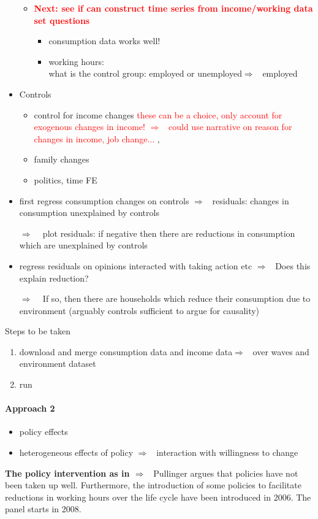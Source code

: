 \documentclass[12pt]{article}
\newcommand{\ar}{$\Rightarrow$ \ }
\newcommand{\tr}[1]{\textcolor{red}{#1}}
\begin{document}
\begin{itemize}
\begin{itemize}
\item\tr{\textbf{ Next: see if can construct time series from income/working data set questions}}
\begin{itemize}
\item consumption data works well! 
\item working hours: \\ what is the control group: employed or unemployed\ar employed
\end{itemize}
	\end{itemize}
\item Controls
\begin{itemize}
\item control for income changes \tr{these can be a choice, only account for exogenous changes in income! \ar could use narrative on reason for changes in income, job change... }, 
\item family changes
\item  politics, time FE
\end{itemize}	

\item first regress consumption changes on controls \ar residuals: changes in consumption unexplained by controls
\item[\ar] plot residuals: if negative then there are reductions in consumption which are unexplained by controls
\item regress residuals on opinions interacted with taking action etc \ar Does this explain reduction?
\item[\ar] If so, then there are households which reduce their consumption due to environment (arguably controls sufficient to argue for causality)
\end{itemize}

Steps to be taken
\begin{enumerate}
\item download and merge consumption data and income data\ar over waves and environment dataset
\item run 
\end{enumerate}

\paragraph{Approach 2}
\begin{itemize}
\item policy effects
\item heterogeneous effects of policy \ar interaction with willingness to change
\end{itemize}
\textbf{The policy intervention as in \cite{Pullinger2014WorkingDesign}} \ar Pullinger argues that policies have not been taken up well. Furthermore, the introduction of some policies to facilitate reductions in working hours over the life cycle have been introduced in 2006. The panel starts in 2008. 
\end{document}
